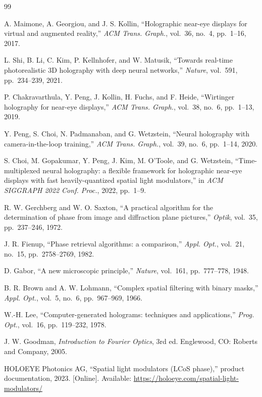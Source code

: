\documentclass[conference]{IEEEtran}
\begin{document}
\begin{thebibliography}{99}

A. Maimone, A. Georgiou, and J. S. Kollin, ``Holographic near-eye displays for
virtual and augmented reality,'' \textit{ACM Trans. Graph.}, vol.~36, no.~4,
pp.~1--16, 2017.

L. Shi, B. Li, C. Kim, P. Kellnhofer, and W. Matusik, ``Towards real-time
photorealistic 3D holography with deep neural networks,'' \textit{Nature},
vol.~591, pp.~234--239, 2021.

P. Chakravarthula, Y. Peng, J. Kollin, H. Fuchs, and F. Heide, ``Wirtinger
holography for near-eye displays,'' \textit{ACM Trans. Graph.}, vol.~38, no.~6,
pp.~1--13, 2019.

Y. Peng, S. Choi, N. Padmanaban, and G. Wetzstein, ``Neural holography with
camera-in-the-loop training,'' \textit{ACM Trans. Graph.}, vol.~39, no.~6,
pp.~1--14, 2020.

S. Choi, M. Gopakumar, Y. Peng, J. Kim, M. O'Toole, and G. Wetzstein,
``Time-multiplexed neural holography: a flexible framework for holographic
near-eye displays with fast heavily-quantized spatial light modulators,'' in
\textit{ACM SIGGRAPH 2022 Conf. Proc.}, 2022, pp.~1--9.

R. W. Gerchberg and W. O. Saxton, ``A practical algorithm for the determination
of phase from image and diffraction plane pictures,'' \textit{Optik}, vol.~35,
pp.~237--246, 1972.

J. R. Fienup, ``Phase retrieval algorithms: a comparison,'' \textit{Appl. Opt.},
vol.~21, no.~15, pp.~2758--2769, 1982.

D. Gabor, ``A new microscopic principle,'' \textit{Nature}, vol.~161,
pp.~777--778, 1948.

B. R. Brown and A. W. Lohmann, ``Complex spatial filtering with binary masks,''
\textit{Appl. Opt.}, vol.~5, no.~6, pp.~967--969, 1966.

W.-H. Lee, ``Computer-generated holograms: techniques and applications,''
\textit{Prog. Opt.}, vol.~16, pp.~119--232, 1978.

J. W. Goodman, \textit{Introduction to Fourier Optics}, 3rd ed. Englewood,
CO: Roberts and Company, 2005.

HOLOEYE Photonics AG, ``Spatial light modulators (LCoS phase),'' product
documentation, 2023. [Online]. Available: \url{https://holoeye.com/spatial-light-modulators/}


\end{thebibliography}
\end{document}
